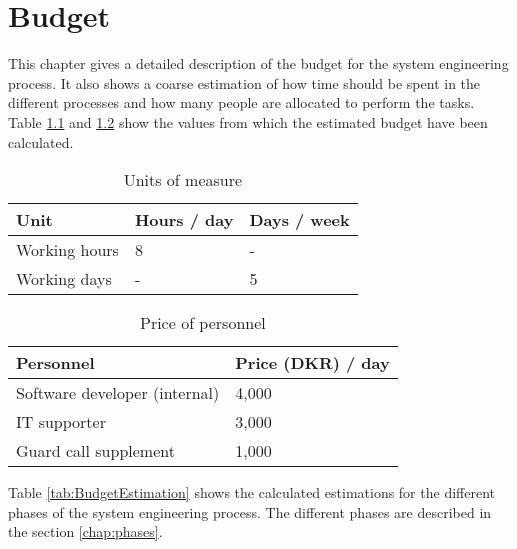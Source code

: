 \chapter{Budget}
This chapter gives a detailed description of the budget for the system engineering process.
It also shows a coarse estimation of how time should be spent in the different processes and how many people are allocated to perform the tasks.
\\

Table \ref{tab:UnitsOfMeasure} and \ref{tab:PriceOfPersonnel} show the values from which the estimated budget have been calculated.

\begin{table}[H]
\centering
\begin{tabular}{|l|ll|}
\hline
\textbf{Unit} & \textbf{Hours / day} & \textbf{Days / week} \\ \hline
Working hours & 8                    & -                    \\
Working days  & -                    & 5                    \\ \hline
\end{tabular}
\caption{Units of measure}
\label{tab:UnitsOfMeasure}
\end{table}

\begin{table}[H]
\centering
\begin{tabular}{|l|l|}
\hline
\textbf{Personnel}            & \textbf{Price (DKR) / day} \\ \hline
Software developer (internal) & 4,000                      \\
IT supporter                  & 3,000                      \\
Guard call supplement         & 1,000                      \\ \hline
\end{tabular}
\caption{Price of personnel}
\label{tab:PriceOfPersonnel}
\end{table}

Table \ref{tab:BudgetEstimation} shows the calculated estimations for the different phases of the system engineering process. The different phases are described in the section \ref{chap:phases}.

